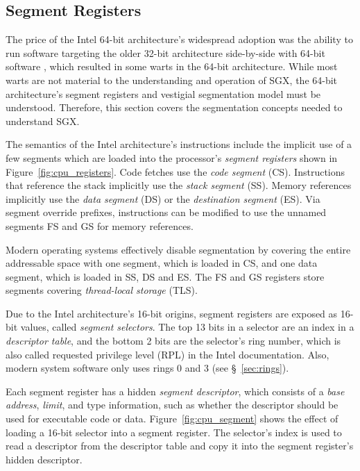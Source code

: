 \subsection{Segment Registers}
\label{sec:segments}

The price of the Intel 64-bit architecture's widespread adoption was the
ability to run software targeting the older 32-bit architecture side-by-side
with 64-bit software \cite{cnet2005itanium}, which resulted in some warts in
the 64-bit architecture. While most warts are not material to the understanding
and operation of SGX, the 64-bit architecture's segment registers and vestigial
segmentation model must be understood. Therefore, this section covers the
segmentation concepts needed to understand SGX.

The semantics of the Intel architecture's instructions include the implicit use
of a few segments which are loaded into the processor's
\textit{segment registers} shown in Figure~\ref{fig:cpu_registers}. Code
fetches use the \textit{code segment} (CS).  Instructions that reference the
stack implicitly use the \textit{stack segment} (SS). Memory references
implicitly use the \textit{data segment} (DS) or the \textit{destination
segment} (ES). Via segment override prefixes, instructions can be modified to
use the unnamed segments FS and GS for memory references.

Modern operating systems effectively disable segmentation by covering the
entire addressable space with one segment, which is loaded in CS, and one data
segment, which is loaded in SS, DS and ES. The FS and GS registers store
segments covering \textit{thread-local storage} (TLS).


Due to the Intel architecture's 16-bit origins, segment registers are exposed
as 16-bit values, called \textit{segment selectors}. The top 13 bits in a
selector are an index in a \textit{descriptor table}, and the bottom 2 bits are
the selector's ring number, which is also called requested privilege level
(RPL) in the Intel documentation. Also, modern system software only uses rings
0 and 3 (see \S~\ref{sec:rings}).


Each segment register has a hidden \textit{segment descriptor}, which consists
of a \textit{base address}, \textit{limit}, and type information, such as
whether the descriptor should be used for executable code or data.
Figure~\ref{fig:cpu_segment} shows the effect of loading a 16-bit selector into
a segment register. The selector's index is used to read a descriptor from the
descriptor table and copy it into the segment register's hidden descriptor.

